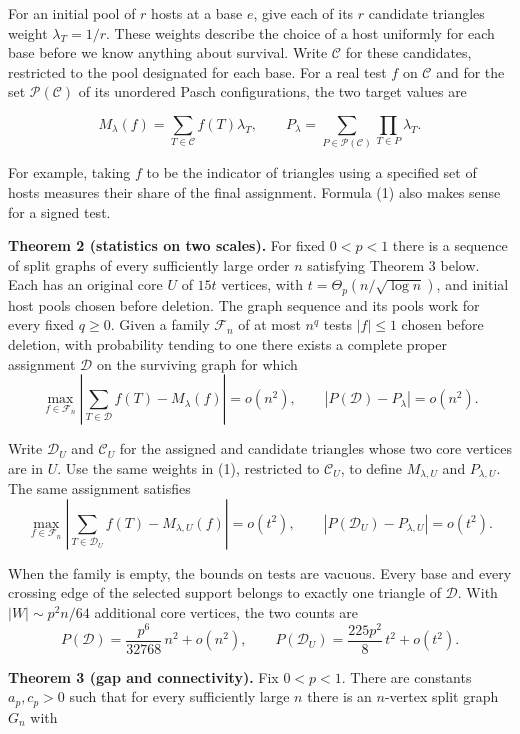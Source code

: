\documentclass[english,11pt,a4paper]{article}
\begin{document}
For an initial pool of \(r\) hosts at a base \(e\), give each of its \(r\) candidate triangles weight \(\lambda_T=1/r\). These weights describe the choice of a host uniformly for each base before we know anything about survival. Write \(\mathcal C\) for these candidates, restricted to the pool designated for each base. For a real test \(f\) on \(\mathcal C\) and for the set \(\mathcal P(\mathcal C)\) of its unordered Pasch configurations, the two target values are

\[M_\lambda(f)=\sum_{T\in\mathcal C} f(T)\lambda_T,\qquad
P_\lambda=\sum_{P\in\mathcal P(\mathcal C)}\prod_{T\in P}\lambda_T.
\tag{1}\]

For example, taking \(f\) to be the indicator of triangles using a specified set of hosts measures their share of the final assignment. Formula (1) also makes sense for a signed test.

\textbf{Theorem 2 (statistics on two scales).} For fixed \(0<p<1\) there is a sequence of split graphs of every sufficiently large order \(n\) satisfying Theorem 3 below. Each has an original core \(U\) of \(15t\) vertices, with \(t=\Theta_p(n/\sqrt{\log n})\), and initial host pools chosen before deletion. The graph sequence and its pools work for every fixed \(q\ge0\). Given a family \(\mathcal F_n\) of at most \(n^q\) tests \(|f|\le1\) chosen before deletion, with probability tending to one there exists a complete proper assignment \(\mathcal D\) on the surviving graph for which \[\max_{f\in\mathcal F_n}\left|\sum_{T\in\mathcal D}f(T)-M_\lambda(f)\right|=o(n^2),
\qquad |P(\mathcal D)-P_\lambda|=o(n^2).
\tag{2}\]

Write \(\mathcal D_U\) and \(\mathcal C_U\) for the assigned and candidate triangles whose two core vertices are in \(U\). Use the same weights in (1), restricted to \(\mathcal C_U\), to define \(M_{\lambda,U}\) and \(P_{\lambda,U}\). The same assignment satisfies \[\max_{f\in\mathcal F_n}\left|\sum_{T\in\mathcal D_U}f(T)-M_{\lambda,U}(f)\right|=o(t^2),
\qquad |P(\mathcal D_U)-P_{\lambda,U}|=o(t^2).
\tag{3}\]

When the family is empty, the bounds on tests are vacuous. Every base and every crossing edge of the selected support belongs to exactly one triangle of \(\mathcal D\). With \(|W|\sim p^2n/64\) additional core vertices, the two counts are \[P(\mathcal D)=\frac{p^6}{32768}\,n^2+o(n^2),
\qquad
P(\mathcal D_U)=\frac{225p^2}{8}\,t^2+o(t^2).
\tag{4}\]

\textbf{Theorem 3 (gap and connectivity).} Fix \(0<p<1\). There are constants \(a_p,c_p>0\) such that for every sufficiently large \(n\) there is an \(n\)-vertex split graph \(G_n\) with
\end{document}
